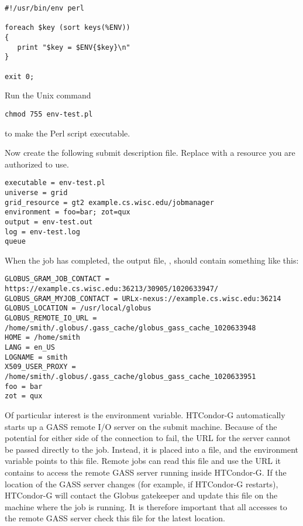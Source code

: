 \begin{verbatim}
#!/usr/bin/env perl

foreach $key (sort keys(%ENV))
{
   print "$key = $ENV{$key}\n"
}

exit 0;
\end{verbatim}

Run the Unix command
\begin{verbatim}
chmod 755 env-test.pl
\end{verbatim}
to make the Perl script executable.

Now create the following submit description file.
Replace  with a resource
you are authorized to use.

\footnotesize
\begin{verbatim}
executable = env-test.pl
universe = grid
grid_resource = gt2 example.cs.wisc.edu/jobmanager
environment = foo=bar; zot=qux
output = env-test.out
log = env-test.log
queue
\end{verbatim}
\normalsize

When the job has completed, the output file, ,
should contain something like this:

\footnotesize
\begin{verbatim}
GLOBUS_GRAM_JOB_CONTACT = https://example.cs.wisc.edu:36213/30905/1020633947/
GLOBUS_GRAM_MYJOB_CONTACT = URLx-nexus://example.cs.wisc.edu:36214
GLOBUS_LOCATION = /usr/local/globus
GLOBUS_REMOTE_IO_URL = /home/smith/.globus/.gass_cache/globus_gass_cache_1020633948
HOME = /home/smith
LANG = en_US
LOGNAME = smith
X509_USER_PROXY = /home/smith/.globus/.gass_cache/globus_gass_cache_1020633951
foo = bar
zot = qux
\end{verbatim}
\normalsize


Of particular interest is the 
environment variable.
HTCondor-G automatically starts up a GASS remote I/O
server on the submit machine.
Because of the potential for either side of the connection to fail,
the URL for the server cannot be passed directly to the job.
Instead, it is placed into a file, and the 
environment variable points to this file.
Remote jobs can read this file and use the URL it contains
to access the remote GASS server running inside HTCondor-G.
If the location
of the GASS server changes (for example, if HTCondor-G restarts),
HTCondor-G will contact the Globus gatekeeper and update this file on
the machine where the job is running.
It is therefore important that all accesses to
the remote GASS server check this file for the latest location.

